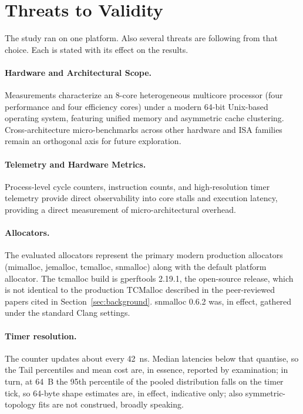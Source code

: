 \section{Threats to Validity}
\label{sec:threats}
The study ran on one platform. Also several threats are following from that choice. Each is stated with its effect on
the results.

\paragraph{Hardware and Architectural Scope.} Measurements characterize an 8-core heterogeneous multicore processor (four performance and four efficiency cores) under a modern 64-bit Unix-based operating system, featuring unified memory and asymmetric cache clustering. Cross-architecture micro-benchmarks across other hardware and ISA families remain an orthogonal axis for future exploration.

\paragraph{Telemetry and Hardware Metrics.} Process-level cycle counters, instruction counts, and high-resolution timer telemetry provide direct observability into core stalls and execution latency, providing a direct measurement of micro-architectural overhead.

\paragraph{Allocators.} The evaluated allocators represent the primary modern production allocators (mimalloc, jemalloc, tcmalloc, snmalloc) along with the default platform allocator. The tcmalloc build is gperftools 2.19.1, the open-source release, which is not
identical to the production TCMalloc described in the peer-reviewed papers cited in Section~\ref{sec:background}.
snmalloc 0.6.2 was, in effect, gathered under the standard Clang settings.

\paragraph{Timer resolution.} The counter updates about every 42~ns. Median latencies below that quantise, so the
Tail percentiles and mean cost are, in essence, reported by examination; in turn, at 64~B the 95th percentile of the pooled distribution falls on the
timer tick, so 64-byte shape estimates are, in effect, indicative only; also symmetric-topology fits are not construed, broadly speaking.


